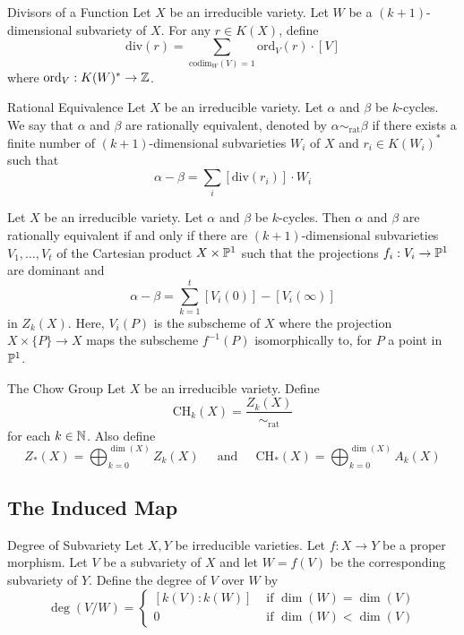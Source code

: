 \documentclass[a4paper]{article}
\begin{document}
\begin{defn}{Divisors of a Function}{} Let $X$ be an irreducible variety. Let $W$ be a $(k+1)$-dimensional subvariety of $X$. For any $r\in K(X)$, define $$\text{div}(r)=\sum_{\text{codim}_W(V)=1}\text{ord}_V(r)\cdot[V]$$ where $\text{ord}_V:K(W)^\ast\to\mathbb{Z}$. 
\end{defn}

\begin{defn}{Rational Equivalence}{} Let $X$ be an irreducible variety. Let $\alpha$ and $\beta$ be $k$-cycles. We say that $\alpha$ and $\beta$ are rationally equivalent, denoted by $\alpha\sim_{\text{rat}}\beta$ if there exists a finite number of $(k+1)$-dimensional subvarieties $W_i$ of $X$ and $r_i\in K(W_i)^\ast$ such that $$\alpha-\beta=\sum_i[\text{div}(r_i)]\cdot W_i$$
\end{defn}

\begin{thm}{}{} Let $X$ be an irreducible variety. Let $\alpha$ and $\beta$ be $k$-cycles. Then $\alpha$ and $\beta$ are rationally equivalent if and only if there are $(k+1)$-dimensional subvarieties $V_1,\dots,V_t$ of the Cartesian product $X\times\mathbb{P}^1$ such that the projections $f_i:V_i\to\mathbb{P}^1$ are dominant and $$\alpha-\beta=\sum_{k=1}^t[V_i(0)]-[V_i(\infty)]$$ in $Z_k(X)$. Here, $V_i(P)$ is the subscheme of $X$ where the projection $X\times\{P\}\to X$ maps the subscheme $f^{-1}(P)$ isomorphically to, for $P$ a point in $\mathbb{P}^1$. 
\end{thm}

\begin{defn}{The Chow Group}{} Let $X$ be an irreducible variety. Define $$\text{CH}_k(X)=\frac{Z_k(X)}{\sim_\text{rat}}$$ for each $k\in\mathbb{N}$. Also define $$Z_\ast(X)=\bigoplus_{k=0}^{\dim(X)}Z_k(X)\;\;\;\;\text{ and }\;\;\;\;\text{CH}_\ast(X)=\bigoplus_{k=0}^{\dim(X)}A_k(X)$$
\end{defn}

\subsection{The Induced Map}
\begin{defn}{Degree of Subvariety}{} Let $X,Y$ be irreducible varieties. Let $f:X\to Y$ be a proper morphism. Let $V$ be a subvariety of $X$ and let $W=f(V)$ be the corresponding subvariety of $Y$. Define the degree of $V$ over $W$ by $$\deg(V/W)=\begin{cases}
[k(V):k(W)] & \text{ if } \dim(W)=\dim(V)\\
0 & \text{ if } \dim(W)<\dim(V)
\end{cases}$$
\end{defn}
\end{document}
